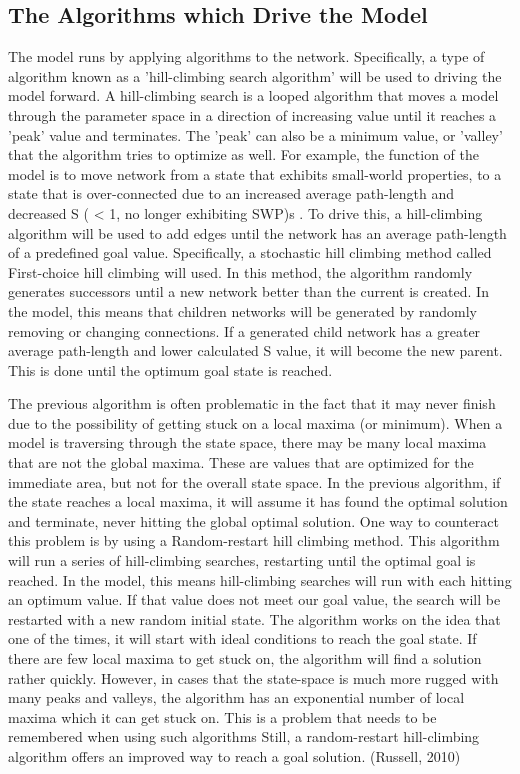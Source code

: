 \documentclass[11pt,letterpaper,doublespacing,titlepage]{article}
\begin{document}
\subsection{The Algorithms which Drive the Model}
\par
The model runs by applying algorithms to the network. Specifically, a type of algorithm known as a 'hill-climbing search algorithm' will be used to driving the model forward. A hill-climbing search is a looped algorithm that moves a model through the parameter space in a direction of increasing value until it reaches a 'peak' value and terminates. The 'peak' can also be a minimum value, or 'valley' that the algorithm tries to optimize as well. For example, the function of the model is to move network from a state that exhibits small-world properties, to a state that is over-connected due to an increased average path-length and decreased S ( < 1, no longer exhibiting SWP)s . To drive this, a hill-climbing algorithm will be used to add edges until the network has an average path-length of a predefined goal value. Specifically, a stochastic hill climbing method called First-choice hill climbing will used. In this method, the algorithm randomly generates successors until a new network better than the current is created. In the model, this means that children networks will be generated by randomly removing or changing connections. If a generated child network has a greater average path-length and lower calculated S value, it will become the new parent. This is done until the optimum goal state is reached.
\par
The previous algorithm is often problematic in the fact that it may never finish due to the possibility of getting stuck on a local maxima (or minimum). When a model is traversing through the state space, there may be many local maxima that are not the global maxima. These are values that are optimized for the immediate area, but not for the overall state space. In the previous algorithm, if the state reaches a local maxima, it will assume it has found the optimal solution and terminate, never hitting the global optimal solution. One way to counteract this problem is by using a Random-restart hill climbing method. This algorithm will run a series of hill-climbing searches, restarting until the optimal goal is reached. In the model, this means hill-climbing searches will run with each hitting an optimum value. If that value does not meet our goal value, the search will be restarted with a new random initial state. The algorithm works on the idea that one of the times, it will start with ideal conditions to reach the goal state. If there are few local maxima to get stuck on, the algorithm will find a solution rather quickly. However, in cases that the state-space is much more rugged with many peaks and valleys,  the algorithm has an exponential number of local maxima which it can get stuck on. This is a problem that needs to be remembered when using such algorithms Still, a random-restart hill-climbing algorithm offers an improved way to reach a goal solution. (Russell, 2010)
\end{document}
